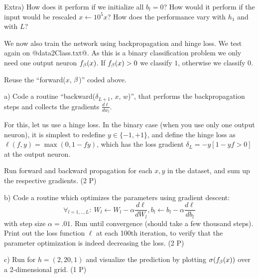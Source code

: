 Extra) How does it perform if we initialize all $b_l=0$? How would it perform if the input would be rescaled $x\gets 10^5 x$? How does the performance vary with $h_1$ and with $L$?




We now also train the network using backpropagation and hinge loss. We test again on @data2Class.txt@. As this
is a binary classification problem we only need one output neuron
$f_\beta(x)$. If $f_\beta(x)>0$ we classify $1$, otherwise we classify
$0$.

Reuse the ``forward($x$, $\beta$)'' coded above.

a) Code a routine ``backward($\delta_{L+1}$, $x$, $w$)'', that performs
the backpropagation steps and collects the gradients $\frac{d\ell}{d w_l}$.

For this, let us use a hinge loss. In the binary case (when you use only one output neuron), it is simplest to redefine $y\in\{-1,+1\}$, and define the hinge loss as $\ell(f, y) = \max(0, 1 - f y)$, which has the loss gradient $\delta_{L} =  -y [1 - yf > 0]$ at the output neuron.

Run forward and backward propagation for each $x, y$ in the dataset,
and sum up the respective gradients. (2 P)

b) Code a routine which optimizes the parameters using gradient descent:
$$\forall_{l=1,..,L}: ~ W_l \gets W_l - \alpha \frac{d\ell}{dW_l}
\comma b_l \gets b_l - \alpha \frac{d\ell}{db_l}$$
with step size $\alpha=.01$. Run
until convergence (should take a few thousand steps). Print out the loss
function $\ell$ at each 100th iteration, to verify that
the parameter optimization is indeed decreasing the loss. (2 P)

c) Run for $h = (2,20,1)$ and visualize the prediction by plotting $\sigma(f_\beta(x))$ over a 2-dimensional grid. (1 P)



\exerfoot
